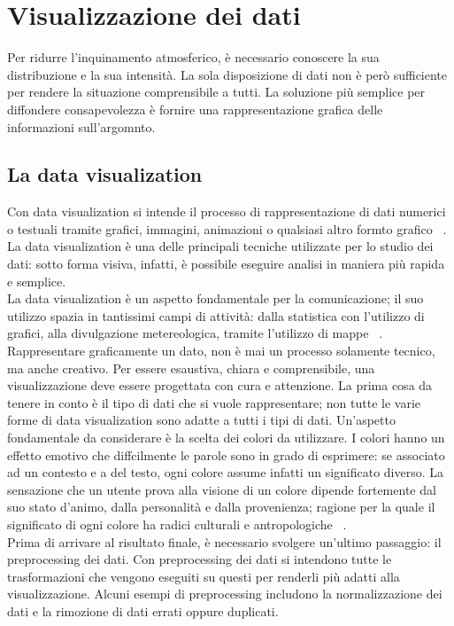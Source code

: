 \section{Visualizzazione dei dati}
Per ridurre l'inquinamento atmosferico, è necessario conoscere la sua distribuzione e la sua intensità.
La sola disposizione di dati non è però sufficiente per rendere la situazione comprensibile a tutti.
La soluzione più semplice per diffondere consapevolezza è fornire una rappresentazione grafica delle informazioni sull'argomnto.
\subsection{La data visualization}
Con data visualization si intende il processo di rappresentazione di dati numerici o testuali tramite grafici, immagini, animazioni o qualsiasi altro formto grafico ~\cite{data_visualization}.
La data visualization è una delle principali tecniche utilizzate per lo studio dei dati: sotto forma visiva, infatti, è possibile eseguire analisi in maniera più rapida e semplice.
\\
La data visualization è un aspetto fondamentale per la comunicazione; il suo utilizzo spazia in tantissimi campi di attività:
dalla statistica con l'utilizzo di grafici, alla divulgazione metereologica, tramite l'utilizzo di mappe ~\cite{data_visualization}.
Rappresentare graficamente un dato, non è mai un processo solamente tecnico, ma anche creativo.
Per essere esaustiva, chiara e comprensibile, una visualizzazione deve essere progettata con cura e attenzione. La prima cosa da tenere in conto è il tipo di dati che si vuole rappresentare; non tutte le varie forme di data visualization sono adatte a tutti i tipi di dati.
Un'aspetto fondamentale da considerare è la scelta dei colori da utilizzare.
I colori hanno un effetto emotivo che diffcilmente le parole sono in grado di esprimere: se associato ad un contesto e a del testo, ogni colore assume infatti un significato diverso.
La sensazione che un utente prova alla visione di un colore dipende fortemente dal suo stato d'animo, dalla personalità e dalla provenienza; ragione per la quale il significato di ogni colore ha radici culturali e antropologiche ~\cite{color_symbolism}.
\\
Prima di arrivare al risultato finale, è necessario svolgere un'ultimo passaggio: il preprocessing dei dati.
Con preprocessing dei dati si intendono tutte le trasformazioni che vengono eseguiti su questi per renderli più adatti alla visualizzazione.
Alcuni esempi di preprocessing includono  la normalizzazione dei dati e la rimozione di dati errati oppure duplicati.

